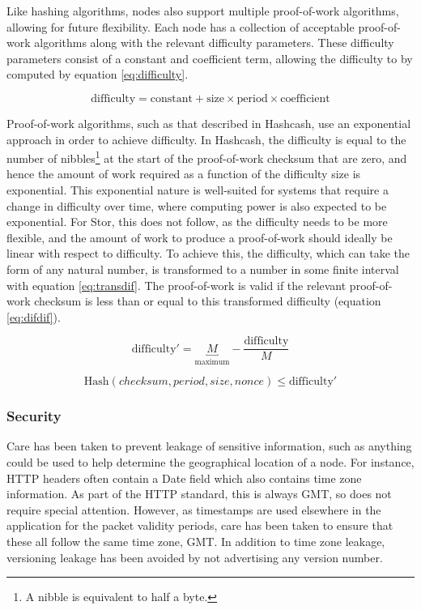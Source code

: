 			Like hashing algorithms, nodes also support multiple proof-of-work algorithms, allowing for future flexibility. Each node has a collection of acceptable proof-of-work algorithms along with the relevant difficulty parameters. These difficulty parameters consist of a constant and coefficient term, allowing the difficulty to by computed by equation \ref{eq:difficulty}. 
		
			\begin{equation} \label{eq:difficulty}
			\text{difficulty} = \text{constant} + \text{size} \times \text{period} \times \text{coefficient}
			\end{equation}
			
			Proof-of-work algorithms, such as that described in Hashcash, use an exponential approach in order to achieve difficulty. In Hashcash, the difficulty is equal to the number of nibbles\footnote{A nibble is equivalent to half a byte.} at the start of the proof-of-work checksum that are zero, and hence the amount of work required as a function of the difficulty size is exponential. This exponential nature is well-suited for systems that require a change in difficulty over time, where computing power is also expected to be exponential. For Stor, this does not follow, as the difficulty needs to be more flexible, and the amount of work to produce a proof-of-work should ideally be linear with respect to difficulty. To achieve this, the difficulty, which can take the form of any natural number, is transformed to a number in some finite interval with equation \ref{eq:transdif}. The proof-of-work is valid if the relevant proof-of-work checksum is less than or equal to this transformed difficulty (equation \ref{eq:difdif}).
		
			\begin{equation} \label{eq:transdif}
			\text{difficulty}' = \underbracket{M}_\text{maximum} - \frac{\text{difficulty}}{M}
			\end{equation}
			
			\begin{equation} \label{eq:difdif}
			\text{Hash}(checksum, period, size, nonce) \le \text{difficulty}'
			\end{equation}

				
		
		
		\subsubsection*{Security}
			Care has been taken to prevent leakage of sensitive information, such as anything could be used to help determine the geographical location of a node. For instance, HTTP headers often contain a Date field which also contains time zone information. As part of the HTTP standard, this is always GMT, so does not require special attention. However, as timestamps are used elsewhere in the application for the packet validity periods, care has been taken to ensure that these all follow the same time zone, GMT. In addition to time zone leakage, versioning leakage has been avoided by not advertising any version number.
			
